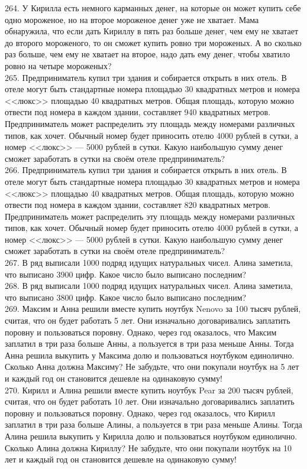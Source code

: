 \documentclass[12pt]{article}
\begin{document}
264. У Кирилла есть немного карманных денег, на которые он может купить себе одно мороженое, но на второе мороженое денег уже не хватает. Мама обнаружила, что если дать Кириллу в пять раз больше денег, чем ему не хватает до второго мороженого, то он сможет купить ровно три мороженых. А во сколько раз больше, чем ему не хватает на второе, надо дать ему денег, чтобы хватило ровно на четыре мороженых?\\
265. Предприниматель купил три здания и собирается открыть в них отель. В отеле могут быть стандартные номера площадью 30 квадратных метров и номера <<люкс>> площадью 40 квадратных метров. Общая площадь, которую можно отвести под номера в каждом здании, составляет 940 квадратных метров. Предприниматель может распределить эту площадь между номерами различных типов, как хочет. Обычный номер будет приносить отелю 4000 рублей в сутки, а номер <<люкс>> --- 5000 рублей в сутки. Какую наибольшую сумму денег сможет заработать в сутки на своём отеле предприниматель?\\
266. Предприниматель купил три здания и собирается открыть в них отель. В отеле могут быть стандартные номера площадью 30 квадратных метров и номера <<люкс>> площадью 40 квадратных метров. Общая площадь, которую можно отвести под номера в каждом здании, составляет 820 квадратных метров. Предприниматель может распределить эту площадь между номерами различных типов, как хочет. Обычный номер будет приносить отелю 4000 рублей в сутки, а номер <<люкс>> --- 5000 рублей в сутки. Какую наибольшую сумму денег сможет заработать в сутки на своём отеле предприниматель?\\
267. В ряд выписали 1000 подряд идущих натуральных чисел. Алина заметила, что выписано 3900 цифр. Какое число было выписано последним?\\
268. В ряд выписали 1000 подряд идущих натуральных чисел. Алина заметила, что выписано 3800 цифр. Какое число было выписано последним?\\
269. Максим и Анна решили вместе купить ноутбук Nenovo за 100 тысяч рублей, считая, что он будет работать 5 лет. Они изначально договаривались заплатить поровну и пользоваться поровну. Однако, через год оказалось, что Максим заплатил в три раза больше Анны, а пользуется в три раза меньше Анны. Тогда Анна решила выкупить у Максима долю и пользоваться ноутбуком единолично. Сколько Анна должна Максиму? Не забудьте, что они покупали ноутбук на 5 лет и каждый год он становится дешевле на одинаковую сумму!\\
270. Кирилл и Алина решили вместе купить ноутбук Pear за 200 тысяч рублей, считая, что он будет работать 10 лет. Они изначально договаривались заплатить поровну и пользоваться поровну. Однако, через год оказалось, что Кирилл заплатил в три раза больше Алины, а пользуется в три раза меньше Алины. Тогда Алина решила выкупить у Кирилла долю и пользоваться ноутбуком единолично. Сколько Алина должна Кириллу? Не забудьте, что они покупали ноутбук на 10 лет и каждый год он становится дешевле на одинаковую сумму!\\
\end{document}
